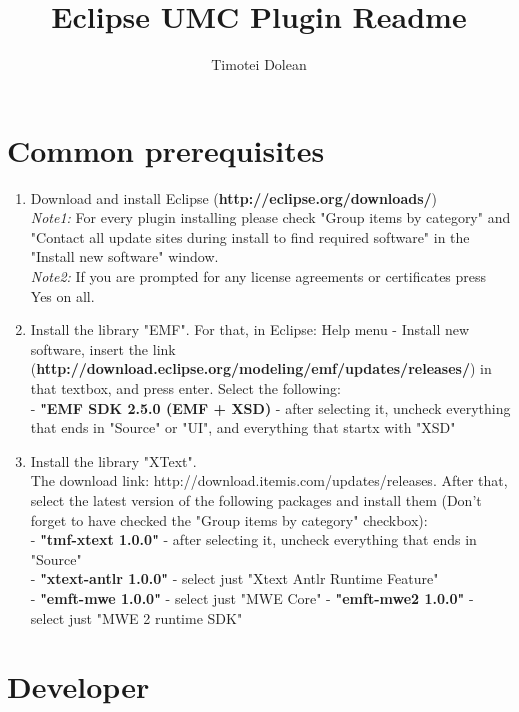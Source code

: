\documentclass[10pt]{article}
\title{Eclipse UMC Plugin Readme}
\author{Timotei Dolean}
\begin{document}
\maketitle

\newcommand{\icnt}{ \stepcounter{cnt} \thecnt }

\section{Common prerequisites}
\begin{enumerate}
\item Download and install Eclipse (\textbf{http://eclipse.org/downloads/}) \\
  \textit{Note1:} For every plugin installing please check "Group items by category" and
    "Contact all update sites during install to find required software" in the "Install new software" window. \\
  \textit{Note2:} If you are prompted for any license agreements or certificates press Yes on all.
\item Install the library "EMF". For that, in Eclipse: Help menu -  Install new software, insert the link \\
  (\textbf{http://download.eclipse.org/modeling/emf/updates/releases/}) in that textbox, and press enter.
  Select the following: \\
  \indent - \textbf{"EMF SDK 2.5.0 (EMF + XSD)} - after selecting it, uncheck everything that ends in "Source" or "UI",
  and everything that startx with "XSD"
\item Install the library "XText". \\
  The download link: http://download.itemis.com/updates/releases.
  After that, select the latest version of the following packages and
  install them (Don't forget to have checked the "Group items by category" checkbox): \\
  \indent - \textbf{"tmf-xtext 1.0.0"} - after selecting it, uncheck everything that ends in "Source" \\
  \indent - \textbf{"xtext-antlr 1.0.0"} - select just "Xtext Antlr Runtime Feature" \\
  \indent - \textbf{"emft-mwe 1.0.0"} - select just "MWE Core"
  \indent - \textbf{"emft-mwe2 1.0.0"} - select just "MWE 2 runtime SDK"
\end{enumerate}

\section{Developer}
\end{document}
